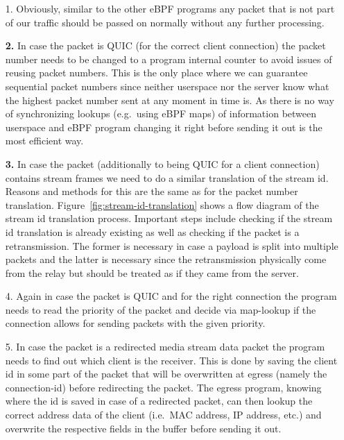 \begin{enumerate}
    \item[1.]   Obviously, similar to the other eBPF programs any packet that is not part of our traffic 
            should be passed on normally without any further processing.
    \item[\textbf{2.}] In case the packet is QUIC (for the correct client connection) the packet number 
            needs to be changed to a program internal counter to avoid issues of reusing packet numbers. 
            This is the only place where we can guarantee sequential packet numbers since neither 
            userspace nor the server know what the highest packet number sent at any moment in time is. 
            As there is no way of synchronizing lookups (e.g.~using eBPF maps) of information between userspace 
            and eBPF program changing it right before sending it out is the most efficient way. 
    \item[\textbf{3.}] In case the packet (additionally to being QUIC for a client connection) contains 
                        stream frames we need to do a similar translation of the stream id.
                        Reasons and methods for this are the same as for the packet number translation.
                        Figure~\ref{fig:stream-id-translation} shows a flow diagram of the stream id translation
                        process.
                        Important steps include checking if the stream id translation is already existing as well
                        as checking if the packet is a retransmission.
                        The former is necessary in case a payload is split into multiple packets and the latter is 
                        necessary since the retransmission physically come from the relay but should be treated as 
                        if they came from the server.
    \item[4.] Again in case the packet is QUIC and for the right connection the program needs 
                        to read the priority of the packet and decide via map-lookup if the connection 
                        allows for sending packets with the given priority.
    \item[5.] In case the packet is a redirected media stream data packet the program needs to find out 
            which client is the receiver. 
            This is done by saving the client id in some part of the packet that will be overwritten 
            at egress (namely the connection-id) before redirecting the packet.
            The egress program, knowing where the id is saved in case of a redirected packet, can then
            lookup the correct address data of the client (i.e.~MAC address, IP address, etc.) and
            overwrite the respective fields in the buffer before sending it out.
\end{enumerate}
